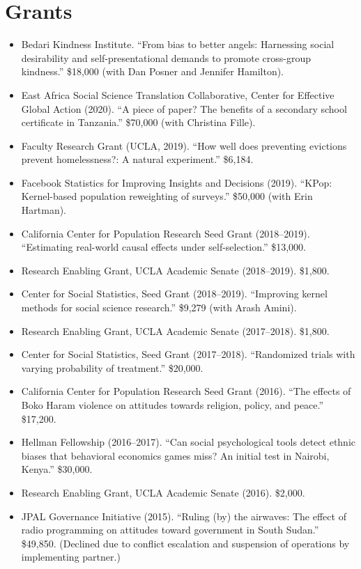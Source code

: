 \documentclass[11pt]{article}
\begin{document}
\section{Grants}
\begin{itemize}
\item Bedari Kindness Institute. ``From bias to better angels: Harnessing social desirability and self-presentational demands to promote cross-group kindness.'' \$18,000 (with Dan Posner and Jennifer Hamilton).
\item East Africa Social Science Translation Collaborative, Center for Effective Global Action (2020). ``A piece of paper? The benefits of a secondary school certificate in Tanzania.'' \$70,000 (with Christina Fille).
\item Faculty Research Grant (UCLA, 2019). ``How well does preventing evictions prevent homelessness?: A natural experiment.'' \$6,184.
\item Facebook Statistics for Improving Insights and Decisions (2019). ``KPop: Kernel-based population reweighting of surveys.'' \$50,000 (with Erin Hartman).
\item California Center for Population Research Seed Grant (2018--2019). ``Estimating real-world causal effects under self-selection.'' \$13,000.
\item Research Enabling Grant, UCLA Academic Senate (2018--2019). \$1,800.
\item Center for Social Statistics, Seed Grant (2018--2019). ``Improving kernel methods for social science research.'' \$9,279 (with Arash Amini).
\item Research Enabling Grant, UCLA Academic Senate (2017--2018). \$1,800.
\item Center for Social Statistics, Seed Grant (2017--2018). ``Randomized trials with varying probability of treatment.'' \$20,000.
\item California Center for Population Research Seed Grant (2016). ``The effects of Boko Haram violence on attitudes towards religion, policy, and peace.'' \$17,200.
\item Hellman Fellowship (2016--2017). ``Can social psychological tools detect ethnic biases that behavioral economics games miss? An initial test in Nairobi, Kenya.'' \$30,000.
\item Research Enabling Grant, UCLA Academic Senate (2016). \$2,000.
\item JPAL Governance Initiative (2015). ``Ruling (by) the airwaves: The effect of radio programming on attitudes toward government in South Sudan.'' \$49,850. (Declined due to conflict escalation and suspension of operations by implementing partner.)
\end{itemize}
\end{document}
